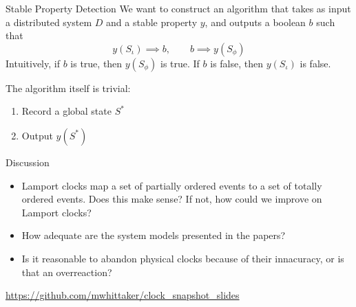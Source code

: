 \documentclass{beamer}
\begin{document}
\begin{frame}
  \begin{center}
    \scalebox{0.7}{
      \begin{tikzpicture}[xscale=3, yscale=1.5]
        \twotoken{}
      \end{tikzpicture}
    }
  \end{center}
\end{frame}

\begin{frame}{Stable Property Detection}
  We want to construct an algorithm that takes as input a distributed system
  $D$ and a stable property $y$, and outputs a boolean $b$ such that
  \[
    y(S_\iota) \implies b, \qquad b \implies y(S_\phi)
  \]
  Intuitively, if $b$ is true, then $y(S_\phi)$ is true. If $b$ is false, then
  $y(S_\iota)$ is false.

  \pause

  The algorithm itself is trivial:
  \begin{enumerate}
    \item Record a global state $S^*$
    \item Output $y(S^*)$
  \end{enumerate}
\end{frame}

\begin{frame}
  \begin{center}
    \scalebox{0.7}{
      \begin{tikzpicture}[xscale=3, yscale=1.5]
        \twotoken{}
      \end{tikzpicture}
    }
  \end{center}
\end{frame}

\begin{frame}{Discussion}
  \pause
  \begin{itemize}
    \item Lamport clocks map a set of partially ordered events to a set of
      totally ordered events. Does this make sense? If not, how could we
      improve on Lamport clocks?
    \item How adequate are the system models presented in the papers?
    \item Is it reasonable to abandon physical clocks because of their
      innacuracy, or is that an overreaction?
  \end{itemize}
\end{frame}

\begin{frame}
  \url{https://github.com/mwhittaker/clock\_snapshot\_slides}
\end{frame}
\end{document}
